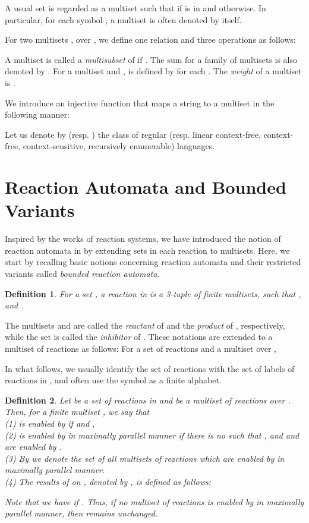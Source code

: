 \documentclass[preprint,fleqn,1p]{elsarticle}
\newtheorem{de}{Definition}
\begin{document}
A usual set  is regarded as a multiset  such that 
  if   is in  and  otherwise.  In particular, 
 for each symbol , a multiset  is often denoted by  itself.

For two multisets ,  over ,  we define one relation and three operations as follows: 

A multiset  is called a {\it multisubset} of  if .  
The sum for a family of multisets  is also denoted by . For a multiset  and ,  is defined by  for each . The {\it weight} of a multiset  is .

We introduce an injective function  that maps a string to a multiset in the following manner: 


Let us denote by  (resp. ) 
 the class of regular (resp. linear context-free, context-free, context-sensitive, recursively enumerable) languages.

\section{Reaction Automata and Bounded Variants}

Inspired by the works  of reaction systems, we have introduced the notion of reaction automata in \cite{OKY:12} by extending sets in each reaction to multisets. Here, we start by recalling basic notions concerning reaction automata and their restricted variants called {\it bounded reaction automata}. 


\begin{de}
{\rm 
For a set ,  a {\it reaction} in  is a 3-tuple  of finite multisets, such that ,  and .
}
\end{de}
The multisets  and  are called the {\it reactant} of  and the {\it product} of , respectively, while the set  is called the {\it inhibitor} of . These notations are extended to a multiset of reactions as follows:    For a set of reactions  and a multiset  over ,  
 

In what follows,  we usually identify the set of reactions  with the set of labels of reactions in , and often use the symbol  as a finite alphabet.

\begin{de}
{\rm 
Let  be a set of reactions in  and   be a multiset of reactions 
over .  Then, for  a finite multiset , we say that \\
(1)  is {\it enabled by}  if  and , \\
(2)   is {\it enabled by  in maximally parallel manner}   
if there is no   such that ,  and   and   are enabled by  .   \\
(3)  By  we denote the set of all multisets of reactions  which are enabled by  in maximally parallel manner.\\
(4) The {\it results of  on }, denoted by , is defined as follows: 
 
Note that we have  if . Thus, if no multiset of reactions  is enabled by  in maximally parallel manner, then  remains unchanged.  
}
\end{de}
\end{document}
